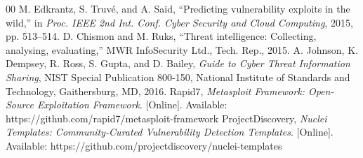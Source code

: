 \documentclass[conference]{IEEEtran}
\begin{document}
\begin{thebibliography}{00}
 M. Edkrantz, S. Truvé, and A. Said, ``Predicting vulnerability exploits in the wild,'' in \textit{Proc. IEEE 2nd Int. Conf. Cyber Security and Cloud Computing}, 2015, pp. 513--514.
 D. Chismon and M. Ruks, ``Threat intelligence: Collecting, analysing, evaluating,'' MWR InfoSecurity Ltd., Tech. Rep., 2015.
 A. Johnson, K. Dempsey, R. Ross, S. Gupta, and D. Bailey, \textit{Guide to Cyber Threat Information Sharing}, NIST Special Publication 800-150, National Institute of Standards and Technology, Gaithersburg, MD, 2016.
 Rapid7, \textit{Metasploit Framework: Open-Source Exploitation Framework}. [Online]. Available: https://github.com/rapid7/metasploit-framework
 ProjectDiscovery, \textit{Nuclei Templates: Community-Curated Vulnerability Detection Templates}. [Online]. Available: https://github.com/projectdiscovery/nuclei-templates
\end{thebibliography}
\end{document}

